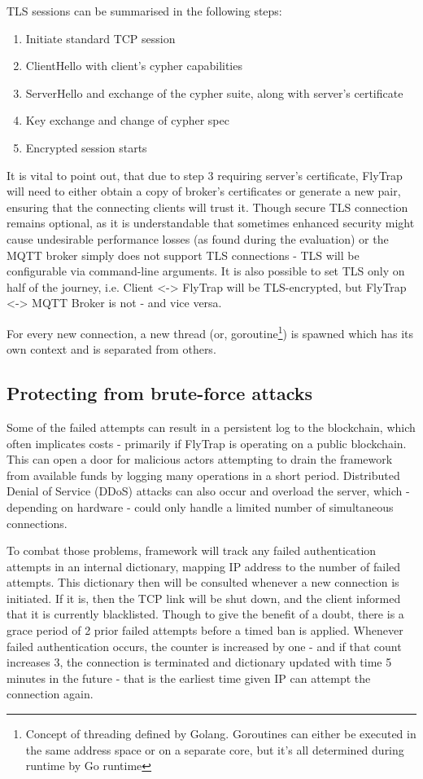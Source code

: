 TLS sessions can be summarised in the following steps:
\begin{enumerate}
\item Initiate standard TCP session
\item ClientHello with client's cypher capabilities 
\item ServerHello and exchange of the cypher suite, along with server's certificate
\item Key exchange and change of cypher spec
\item Encrypted session starts
\end{enumerate}

It is vital to point out, that due to step 3 requiring server's certificate, FlyTrap will need to either obtain a copy of broker's certificates or generate a new pair, ensuring that the connecting clients will trust it. Though secure TLS connection remains optional, as it is understandable that sometimes enhanced security might cause undesirable performance losses (as found during the evaluation) or the MQTT broker simply does not support TLS connections - TLS will be configurable via command-line arguments. It is also possible to set TLS only on half of the journey, i.e. Client <-> FlyTrap will be TLS-encrypted, but FlyTrap <-> MQTT Broker is not - and vice versa.

For every new connection, a new thread (or, goroutine\footnote{Concept of threading defined by Golang. Goroutines can either be executed in the same address space or on a separate core, but it's all determined during runtime by Go runtime}) is spawned which has its own context and is separated from others.

\subsection{Protecting from brute-force attacks}
Some of the failed attempts can result in a persistent log to the blockchain, which often implicates costs - primarily if FlyTrap is operating on a public blockchain. This can open a door for malicious actors attempting to drain the framework from available funds by logging many operations in a short period. Distributed Denial of Service (DDoS) attacks can also occur and overload the server, which - depending on hardware - could only handle a limited number of simultaneous connections.

To combat those problems, framework will track any failed authentication attempts in an internal dictionary, mapping IP address to the number of failed attempts. This dictionary then will be consulted whenever a new connection is initiated. If it is, then the TCP link will be shut down, and the client informed that it is currently blacklisted. Though to give the benefit of a doubt, there is a grace period of 2 prior failed attempts before a timed ban is applied. Whenever failed authentication occurs, the counter is increased by one - and if that count increases 3, the connection is terminated and dictionary updated with time 5 minutes in the future - that is the earliest time given IP can attempt the connection again.
